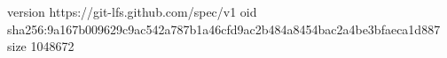 version https://git-lfs.github.com/spec/v1
oid sha256:9a167b009629c9ac542a787b1a46cfd9ac2b484a8454bac2a4be3bfaeca1d887
size 1048672
